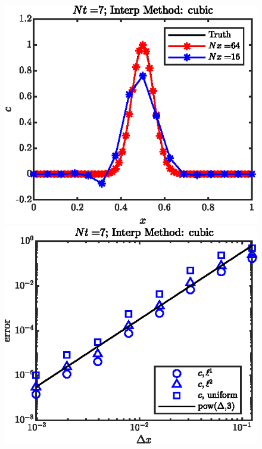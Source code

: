 \documentclass[11pt,letterpaper]{article}
\begin{document}
\begin{figure}[H]
    \centering
    \includegraphics{figs/1D_cons_cubic_sol}
    \includegraphics{figs/1D_cons_cubic_convord}
    \caption{}\label{fig:1D_cons_cubic_}
\end{figure}
\end{document}
